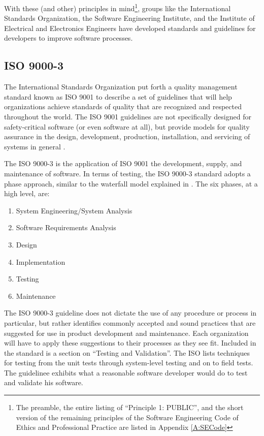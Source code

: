 With these (and other) principles in mind\footnote{The preamble, the entire
listing of ``Principle 1: PUBLIC'', and the short version of the remaining
principles of the Software Engineering Code of Ethics and Professional Practice
are listed in Appendix \ref{A:SECode}}, groups like the International Standards
Organization, the Software Engineering Institute, and the Institute of
Electrical and Electronics Engineers have developed standards and guidelines for
developers to improve software processes.

\subsection{ISO 9000-3}
The International Standards Organization put forth a quality management standard
known as ISO 9001 to describe a set of guidelines that will help organizations
achieve standards of quality that are recognized and respected throughout the
world. The ISO 9001 guidelines are not specifically designed for safety-critical
software (or even software at all), but provide models for quality assurance
in the design, development, production, installation, and servicing of systems
in general \cite{Kehoe96}.

The ISO 9000-3 is the application of ISO 9001 the development, supply, and
maintenance of software. In terms of testing, the ISO 9000-3 standard adopts a
phase approach, similar to the waterfall model explained in \cite{Royce70}. The
six phases, at a high level, are:
\singlespace
\begin{enumerate}
  \item System Engineering/System Analysis
  \item Software Requirements Analysis
  \item Design
  \item Implementation
  \item Testing
  \item Maintenance
\end{enumerate}
\doublespace

The ISO 9000-3 guideline does not dictate the use of any procedure or process in
particular, but rather identifies commonly accepted and sound practices that are
suggested for use in product development and maintenance. Each organization will
have to apply these suggestions to their processes as they see fit. Included in
the standard is a section on ``Testing and Validation''. The ISO lists
techniques for testing from the unit tests through system-level testing and on
to field tests. The guidelinee exhibits what a reasonable software developer
would do to test and validate his software.

